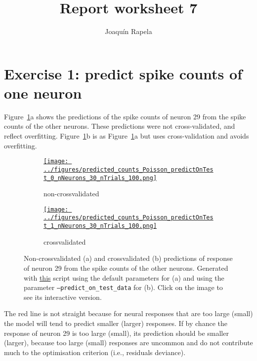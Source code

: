 \documentclass[12pt]{article}
\title{Report worksheet 7}
\author{Joaqu\'{i}n Rapela}
\def\figWidth{4.5in}
\begin{document}
\maketitle

\section*{Exercise 1: predict spike counts of one neuron}

Figure~\ref{fig:predictions_one_neuron}a shows the predictions of the spike
counts of neuron 29 from the spike counts of the other neurons. These
predictions were not cross-validated, and reflect overfitting.
%
Figure~\ref{fig:predictions_one_neuron}b is as
Figure~\ref{fig:predictions_one_neuron}a but uses cross-validation and avoids
overfitting.

\begin{figure}[H]
    \centering
    \begin{subfigure}{\textwidth}
	        \centering
        \href{https://www.gatsby.ucl.ac.uk/~rapela/neuroinformatics/2023/ws7/figures/predicted_counts_Poisson_predictOnTest_0_nNeurons_30_nTrials_100.html}{\texttt{[image: ../figures/predicted\_counts\_Poisson\_predictOnTest\_0\_nNeurons\_30\_nTrials\_100.png]}}
	        \caption{non-crossvalidated}
    \end{subfigure}
    \linebreak
    \begin{subfigure}{\textwidth}
        \centering
        \href{https://www.gatsby.ucl.ac.uk/~rapela/neuroinformatics/2023/ws7/figures/predicted_counts_Poisson_predictOnTest_1_nNeurons_30_nTrials_100.html}{\texttt{[image: ../figures/predicted\_counts\_Poisson\_predictOnTest\_1\_nNeurons\_30\_nTrials\_100.png]}}
	        \caption{crossvalidated}
    \end{subfigure}

    \caption{Non-crossvalidated (a) and crossvalidated (b) predictions of
	response of neuron 29 from the spike counts of the other neurons.
	Generated with
	\href{https://github.com/joacorapela/neuroinformatics23/blob/master/worksheets/ws7/mySolution/code/scripts/doComputeOneSetOfPredictions.py}{this}
	script using the default parameters for (a) and using the parameter
	\texttt{--predict\_on\_test\_data} for (b). Click on the image to see its
	interactive version.}

    \label{fig:predictions_one_neuron}
\end{figure}

The red line is not straight because for neural responses that are too large
(small) the model will tend to predict smaller (larger) responses. If by
chance the response of neuron 29 is too large (small), its prediction should be
smaller (larger), because too large (small) responses are uncommon and do not
contribute much to the optimisation criterion (i.e., residuals deviance).
\end{document}
